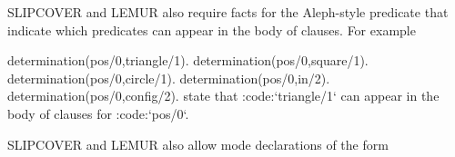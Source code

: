 \documentclass[letterpaper,10pt,english]{sphinxmanual}
\begin{document}
\begin{sphinxVerbatim}[commandchars=\\\{\}]


\end{sphinxVerbatim}

SLIPCOVER and LEMUR also require facts for the  Aleph-style predicate that indicate which predicates can appear in the body of clauses.
For example

\begin{sphinxVerbatim}[commandchars=\\\{\}]
determination(pos/0,triangle/1).
determination(pos/0,square/1).
determination(pos/0,circle/1).
determination(pos/0,in/2).
determination(pos/0,config/2).
state that :code:{}`triangle/1{}` can appear in the body of clauses for :code:{}`pos/0{}`.
\end{sphinxVerbatim}

SLIPCOVER and LEMUR also allow mode declarations of the form
\end{document}
